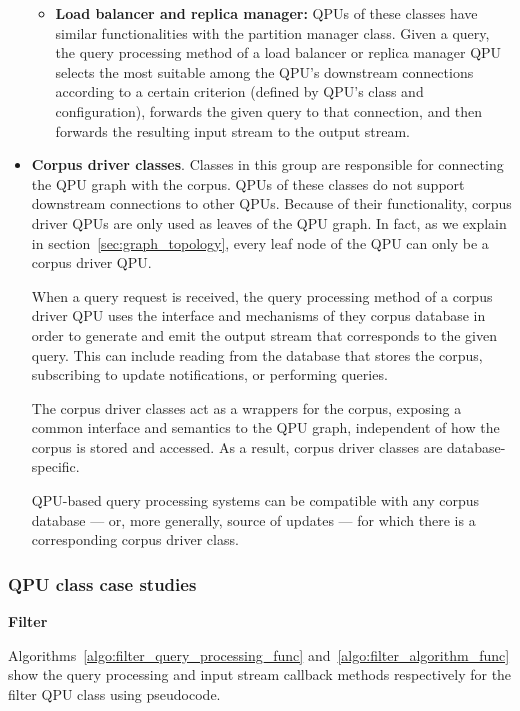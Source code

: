 \begin{itemize}
\begin{itemize}
    \item \textbf{Load balancer and replica manager:}
    QPUs of these classes have similar functionalities with the partition manager class.
    Given a query, the query processing method of a load balancer or replica manager QPU selects the most suitable
    among the QPU's downstream connections according to a certain criterion (defined by QPU's class and configuration),
    forwards the given query to that connection, and then forwards the resulting input stream to the output stream.
    \end{itemize}

  \item \textbf{Corpus driver classes}.
  Classes in this group are responsible for connecting the QPU graph with the corpus.
  QPUs of these classes do not support downstream connections to other QPUs.
  Because of their functionality, corpus driver QPUs are only used as leaves of the QPU graph.
  In fact, as we explain in section~\ref{sec:graph_topology}, every leaf node of the QPU can only be a corpus driver QPU.

  When a query request is received, the query processing method of a corpus driver QPU uses the interface and mechanisms
  of they corpus database in order to generate and emit the output stream that corresponds to the given query.
  This can include reading from the database that stores the corpus, subscribing to update notifications,
  or performing queries.

  The corpus driver classes act as a wrappers for the corpus, exposing a common interface and semantics to the
  QPU graph, independent of how the corpus is stored and accessed.
  As a result, corpus driver classes are database-specific.

  QPU-based query processing systems can be compatible with any corpus database --- or, more generally, source of updates ---
  for which there is a corresponding corpus driver class.
\end{itemize}

\subsubsection{QPU class case studies}
\label{sec:qpu_class_examples}

\textbf{Filter}

Algorithms~\ref{algo:filter_query_processing_func} and~\ref{algo:filter_algorithm_func} show the query processing and
input stream callback methods respectively for the filter QPU class using pseudocode.


